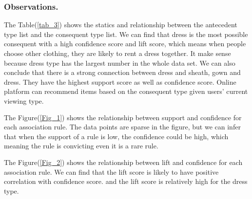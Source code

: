\documentclass[sigconf]{acmart}
\begin{document}
\subsubsection{Observations.} 
The Table(\ref{tab_3}) shows the statics and relationship between the antecedent type list and the consequent type list. We can find that dress is the most possible consequent with a high confidence score and lift score, which means when people choose other clothing, they are likely to rent a dress together. It make sense because dress type has the largest number in the whole data set. 
We can also conclude that there is a strong connection between dress and sheath, gown and dress. They have the highest support score as well as confidence score. Online platform can recommend items based on the consequent type given users' current viewing type.

The Figure(\ref{Fig_1}) shows the relationship between support and confidence for each association rule. The data points are sparse in the figure, but we can infer that when the support of a rule is low, the confidence could be high, which meaning the rule is convicting even it is a rare rule.

The Figure(\ref{Fig_2}) shows the relationship between lift and confidence for each association rule. We can find that the lift score is likely to have positive correlation with confidence score. and the lift score is relatively high for the dress type.
\end{document}
